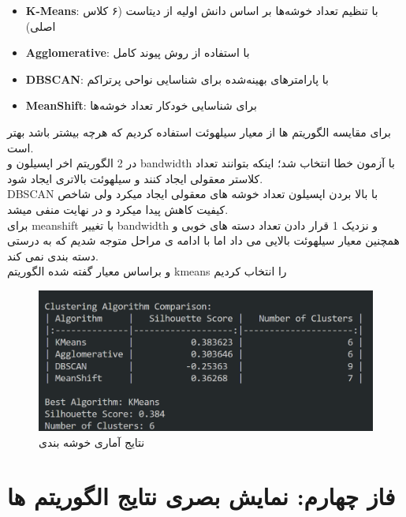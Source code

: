 \documentclass[a4paper,12pt]{article}
\let\nobreaksection\section
\renewcommand{\section}{\nobreaksection}
\begin{document}
\begin{itemize}
\item \textbf{K-Means}: با تنظیم تعداد خوشه‌ها بر اساس دانش اولیه از دیتاست (۶ کلاس اصلی)
\item \textbf{Agglomerative}: با استفاده از روش پیوند کامل
\item \textbf{DBSCAN}: با پارامترهای بهینه‌شده برای شناسایی نواحی پرتراکم
\item \textbf{MeanShift}: برای شناسایی خودکار تعداد خوشه‌ها
\end{itemize}
 برای مقایسه الگوریتم ها از معیار  سیلهوئت استفاده کردیم که هرچه بیشتر باشد بهتر است.
\\
در 2 الگوریتم اخر اپسیلون و bandwidth با آزمون خطا انتخاب شد؛ اینکه بتوانند تعداد کلاستر معقولی ایجاد کنند و سیلهوئت  بالاتری ایجاد شود.
\\
DBSCAN با بالا بردن اپسیلون تعداد خوشه های معقولی ایجاد میکرد ولی شاخص کیفیت کاهش پیدا میکرد و در نهایت منفی میشد.
\\
برای meanshift با تغییر bandwidth و نزدیک 1 قرار دادن تعداد دسته های خوبی و همچنین معیار سیلهوئت  بالایی می داد اما با ادامه ی مراحل متوجه شدیم که به درستی دسته بندی نمی کند.
 \\
و براساس معیار گفته شده الگوریتم kmeans را انتخاب کردیم
\begin{figure}[h]
\centering
\includegraphics[width=\textwidth]{clustring_result.png}
\caption{نتایج آماری خوشه بندی}
\label{fig:clustering_results}
\end{figure}

\section{فاز چهارم: نمایش بصری نتایج الگوریتم ها}
\end{document}
